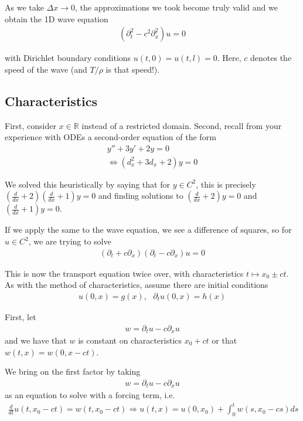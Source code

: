 \documentclass{article}
\newcommand{\R}{{\mathbb{R}}}
\newcommand{\pd}{\partial}
\begin{document}
	
	As we take $\Delta x \to 0$, the approximations we took become truly valid and we obtain the 1D wave equation 
	\begin{align*}
		(\pd_{t}^{2} - c^{2} \pd_{x}^{2} )u = 0
	\end{align*}
	
	with Dirichlet boundary conditions $u(t,0) = u(t,l) = 0$. Here, $c$ denotes the speed of the wave (and $T/\rho$ is that speed!). 
	
	
	\subsection{Characteristics}
	
	First, consider $x \in \R$ instead of a restricted domain. Second, recall from your experience with ODEs a second-order equation of the form 
	\begin{align*}
		y'' + 3y' + 2y = 0 \\
		\Leftrightarrow (d_{x}^{2} +3d_{x}+2)y = 0
	\end{align*}
	
	We solved this heuristically by saying that for $y \in C^{2}$, this is precisely $\left(\frac{d}{dx}+2\right)(\frac{d}{dx}+1)y=0$ and finding solutions to $(\frac{d}{dx}+2)y=0$ and $(\frac{d}{dx}+1)y = 0$. 
	
	If we apply the same to the wave equation, we see a difference of squares, so for $u \in C^{2}$, we are trying to solve
	\begin{align*}
		(\pd_{t} + c \pd_{x})(\pd_{t}-c\pd_{x})u=0
	\end{align*}
	
	This is now the transport equation twice over, with characteristics $t \mapsto x_0 \pm ct$. As with the method of characteristics, assume there are initial conditions
	\begin{align*}
		u(0,x) = g(x), \,\,\,\, \pd_{t}u(0,x) = h(x)
	\end{align*}
	
	First, let 
	\begin{align*}
		w = \pd_{t} u - c \pd_{x}u
	\end{align*}
	and we have that $w$ is constant on characteristics $x_0 + ct$ or that $w(t,x) = w(0,x-ct)$.
	
	We bring on the first factor by taking 
	\begin{align*}
		w = \pd_{t} u - c \pd_{x}u
	\end{align*}
	as an equation to solve with a forcing term, i.e. 
	\begin{align*}
		\frac{d}{dt} u(t,x_0 - ct) = w(t,x_0-ct) \Rightarrow 
		u(t,x) = u(0,x_0) + \int_{0}^{t} w(s,x_0-cs)ds
	\end{align*}  
	
\end{document}
